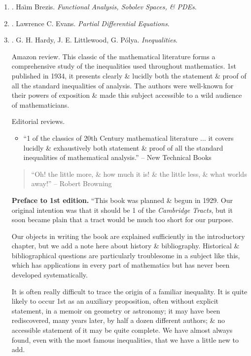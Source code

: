 \documentclass{article}
\begin{document}
\begin{enumerate}
	\item \cite{Brezis2011}. {\sc Ha\"\i m Brezis}. {\it Functional Analysis, Sobolev Spaces, \& PDEs}.\hfill{\sf[reading]}
	
	\item \cite{Evans2010}. {\sc Lawrence C. Evans}. {\it Partial Differential Equations}.\hfill{\sf[reading]}
	
	\item \cite{Hardy_Littlewood_Polya1952}. {\sc G. H. Hardy, J. E. Littlewood, G. P\'{o}lya}. {\it Inequalities}. {}
	
	{\sf Amazon review.} This classic of the mathematical literature forms a comprehensive study of the inequalities used throughout mathematics. 1st published in 1934, it presents clearly \& lucidly both the statement \& proof of all the standard inequalities of analysis. The authors were well-known for their powers of exposition \& made this subject accessible to a wild audience of mathematicians.
	
	{\sf Editorial reviews.}
	\begin{itemize}
		\item ``1 of the classics of 20th Century mathematical literature $\ldots$ it covers lucidly \& exhaustively both statement \& proof of all the standard inequalities of mathematical analysis.'' -- New Technical Books
	\end{itemize}
	\begin{quote}
		``Oh! the little more, \& how much it is! \& the little less, \& what worlds away!'' -- {\sc Robert Browning}
	\end{quote}
	{\bf Preface to 1st edition.} ``This book was planned \& begun in 1929. Our original intention was that it should be 1 of the {\it Cambridge Tracts}, but it soon became plain that a tract would be much too short for our purpose.
	
	Our objects in writing the book are explained sufficiently in the introductory chapter, but we add a note here about history \& bibliography. Historical \& bibliographical questions are particularly troublesome in a subject like this, which has applications in every part of mathematics but has never been developed systematically.
	
	It is often really difficult to trace the origin of a familiar inequality. It is quite likely to occur 1st as an auxiliary proposition, often without explicit statement, in a memoir on geometry or astronomy; it may have been rediscovered, many years later, by half a dozen different authors; \& no accessible statement of it may be quite complete. We have almost always found, even with the most famous inequalities, that we have a little new to add.
	

\end{enumerate}
\end{document}
